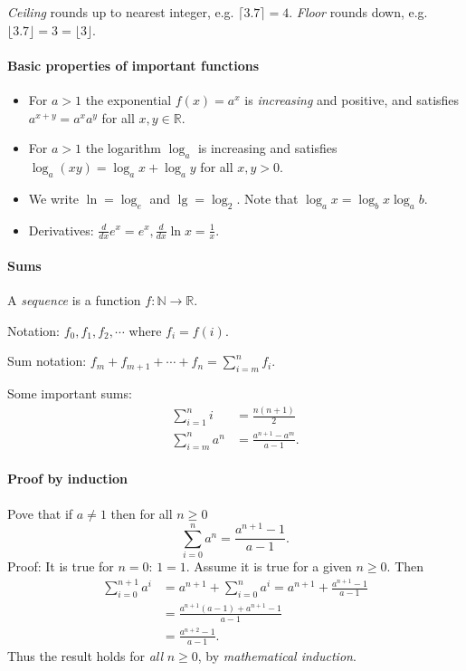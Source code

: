 \item \emph{Ceiling} rounds up to nearest integer, e.g. $\lceil 3.7 \rceil = 4$. \emph{Floor} rounds down, e.g. $\lfloor 3.7 \rfloor= 3 = \lfloor 3 \rfloor$.




\paragraph{Basic properties of important functions}
\begin{itemize}[<+->]
\item For $a>1$ the exponential $f(x) = a^x$ is \emph{increasing} and positive, and satisfies $a^{x+y} = a^x a^y$ for all $x,y\in \mathbb{R}$.
\item For $a>1$ the logarithm $\log_a$ is increasing and satisfies $\log_a(xy) = \log_a x + \log_a y$ for all $x,y>0$.
\item We write $\ln = \log_e$ and $\lg = \log_2$. Note that $\log_a x = \log_b x \log_a b$.
\item Derivatives: $\frac{d}{dx} e^x = e^x, \frac{d}{dx} \ln x = \frac{1}{x}$.
\end{itemize}


\paragraph{Sums}

A \emph{sequence} is a function $f:\mathbb{N} \to \mathbb{R}$. 

Notation: $f_0, f_1, f_2, \cdots$ where $f_i = f(i)$.

Sum notation: $f_m+f_{m+1}+\cdots +f_n = \sum_{i=m}^n f_i$.

Some important sums: 
\begin{align*}
\sum_{i=1}^n i & = \frac{n(n+1)}{2} \\
\sum_{i=m}^n a^n&  = \frac{a^{n+1}-a^m}{a-1}.
\end{align*}




\paragraph{Proof by induction}

\begin{Example}
Pove that if $a\neq 1$ then for all  $n\geq 0$
$$
\sum_{i=0}^n a^n = \frac{a^{n+1} - 1}{a - 1}.
$$
Proof: It is true for $n=0$: $1 = 1$. Assume it is true for a given  $n\geq 0$. Then
\begin{align*}
\sum_{i=0}^{n+1} a^i & = a^{n+1} + \sum_{i=0}^n a^i 
= a^{n+1} + \frac{a^{n+1} - 1}{a-1} \\
& = \frac{a^{n+1} (a - 1) + a^{n+1} - 1}{a-1}\\
& = \frac{a^{n+2} - 1}{a-1}.
\end{align*}
Thus the result holds for \emph{all} $n\geq 0$, by \emph{mathematical induction}.
\end{Example}



